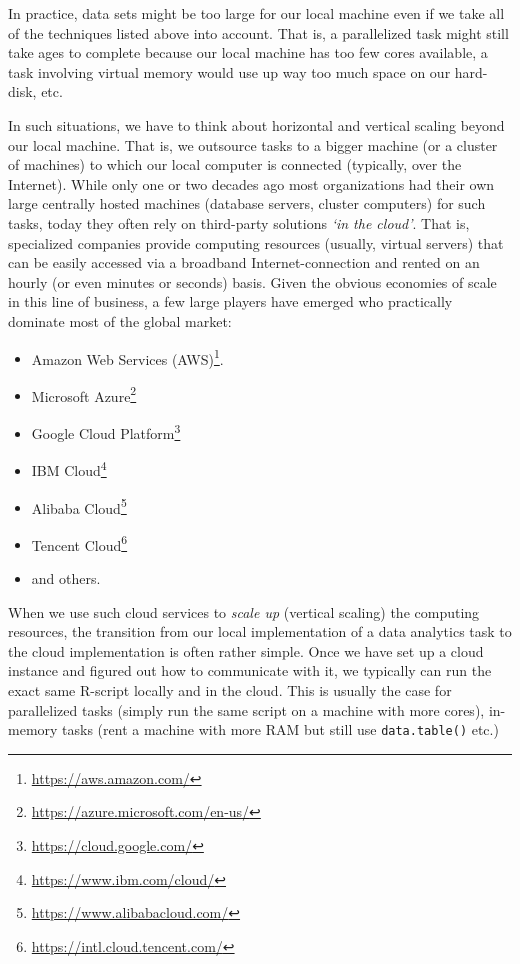\documentclass[
  12pt,
]{style/krantz}
\providecommand{\tightlist}{%
  \setlength{\itemsep}{0pt}\setlength{\parskip}{0pt}}
\renewcommand{\href}[2]{#2\footnote{\url{#1}}}
\begin{document}
In practice, data sets might be too large for our local machine even if we take all of the techniques listed above into account. That is, a parallelized task might still take ages to complete because our local machine has too few cores available, a task involving virtual memory would use up way too much space on our hard-disk, etc.

In such situations, we have to think about horizontal and vertical scaling beyond our local machine. That is, we outsource tasks to a bigger machine (or a cluster of machines) to which our local computer is connected (typically, over the Internet). While only one or two decades ago most organizations had their own large centrally hosted machines (database servers, cluster computers) for such tasks, today they often rely on third-party solutions \emph{`in the cloud'}. That is, specialized companies provide computing resources
(usually, virtual servers) that can be easily accessed via a broadband Internet-connection and rented on an hourly (or even minutes or seconds) basis. Given the obvious economies of scale in this line of business, a few large players have emerged who practically dominate most of the global market:

\begin{itemize}
\tightlist
\item
  \href{https://aws.amazon.com/}{Amazon Web Services (AWS)}.
\item
  \href{https://azure.microsoft.com/en-us/}{Microsoft Azure}
\item
  \href{https://cloud.google.com/}{Google Cloud Platform}
\item
  \href{https://www.ibm.com/cloud/}{IBM Cloud}
\item
  \href{https://www.alibabacloud.com/}{Alibaba Cloud}
\item
  \href{https://intl.cloud.tencent.com/}{Tencent Cloud}
\item
  and others.
\end{itemize}

When we use such cloud services to \emph{scale up} (vertical scaling) the computing resources, the transition from our local implementation of a data analytics task to the cloud implementation is often rather simple. Once we have set up a cloud instance and figured out how to communicate with it, we typically can run the exact same R-script locally and in the cloud. This is usually the case for parallelized tasks (simply run the same script on a machine with more cores), in-memory tasks (rent a machine with more RAM but still use \texttt{data.table()} etc.)
\end{document}
